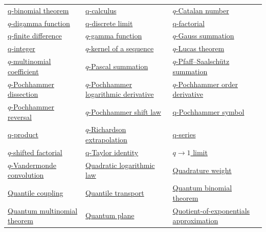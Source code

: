 \documentclass[11pt,oneside]{article}
\begin{document}
\begin{longtable}{L{0.31\textwidth}L{0.31\textwidth}L{0.31\textwidth}}
\hyperlink{gls:q-binomial-theorem}{q-binomial theorem} & \hyperlink{gls:q-calculus}{q-calculus} & \hyperlink{gls:q-catalan-number}{\(q\)-Catalan number} \\
\hyperlink{gls:q-digamma-function}{\(q\)-digamma function} & \hyperlink{gls:q-discrete-limit}{q-discrete limit} & \hyperlink{gls:q-factorial}{q-factorial} \\
\hyperlink{gls:q-finite-difference}{q-finite difference} & \hyperlink{gls:q-gamma-function}{\(q\)-gamma function} & \hyperlink{gls:q-gauss-summation}{\(q\)-Gauss summation} \\
\hyperlink{gls:q-integer}{q-integer} & \hyperlink{gls:q-kernel}{\(q\)-kernel of a sequence} & \hyperlink{gls:q-lucas-theorem}{\(q\)-Lucas theorem} \\
\hyperlink{gls:q-multinomial-coefficient}{\(q\)-multinomial coefficient} & \hyperlink{gls:q-pascal-summation}{\(q\)-Pascal summation} & \hyperlink{gls:q-pfaff-saalschutz-summation}{\(q\)-Pfaff--Saalschütz summation} \\
\hyperlink{gls:q-pochhammer-dissection}{\(q\)-Pochhammer dissection} & \hyperlink{gls:q-pochhammer-logarithmic-derivative}{\(q\)-Pochhammer logarithmic derivative} & \hyperlink{gls:q-pochhammer-order-derivative}{\(q\)-Pochhammer order derivative} \\
\hyperlink{gls:q-pochhammer-reversal}{\(q\)-Pochhammer reversal} & \hyperlink{gls:q-pochhammer-shift-law}{\(q\)-Pochhammer shift law} & \hyperlink{gls:q-pochhammer-symbol}{q-Pochhammer symbol} \\
\hyperlink{gls:q-product}{q-product} & \hyperlink{gls:q-richardson-extrapolation}{\(q\)-Richardson extrapolation} & \hyperlink{gls:q-series}{q-series} \\
\hyperlink{gls:q-shifted-factorial}{\(q\)-shifted factorial} & \hyperlink{gls:q-taylor-identity}{q-Taylor identity} & \hyperlink{gls:q-to-one-limit}{\(q\to1\) limit} \\
\hyperlink{gls:q-vandermonde-summation}{\(q\)-Vandermonde convolution} & \hyperlink{gls:quadratic-logarithmic-law}{Quadratic logarithmic law} & \hyperlink{gls:quadrature-weight}{Quadrature weight} \\
\hyperlink{gls:quantile-coupling}{Quantile coupling} & \hyperlink{gls:quantile-transport}{Quantile transport} & \hyperlink{gls:quantum-binomial-theorem}{Quantum binomial theorem} \\
\hyperlink{gls:quantum-multinomial-theorem}{Quantum multinomial theorem} & \hyperlink{gls:quantum-plane}{Quantum plane} & \hyperlink{gls:quotient-of-exponentials-approximation}{Quotient-of-exponentials approximation} \\

\end{longtable}
\end{document}
